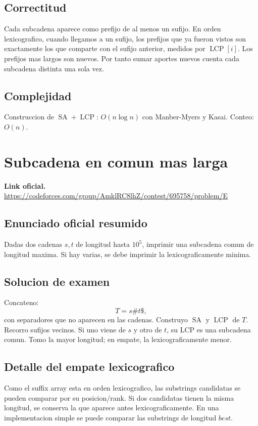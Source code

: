 \documentclass[10pt]{article}
\newcommand{\bigO}{O}
\newcommand{\SA}{\operatorname{SA}}
\newcommand{\LCP}{\operatorname{LCP}}
\begin{document}
\subsection{Correctitud}
Cada subcadena aparece como prefijo de al menos un sufijo. En orden
lexicografico, cuando llegamos a un sufijo, los prefijos que ya fueron vistos
son exactamente los que comparte con el sufijo anterior, medidos por $\LCP[i]$.
Los prefijos mas largos son nuevos. Por tanto sumar aportes nuevos cuenta cada
subcadena distinta una sola vez.

\subsection{Complejidad}
Construccion de $\SA+\LCP$: $\bigO(n\log n)$ con Manber-Myers y Kasai. Conteo:
$\bigO(n)$.

\newpage

\section{Subcadena en comun mas larga}
\textbf{Link oficial.} \url{https://codeforces.com/group/AmklRC8lhZ/contest/695758/problem/E}

\subsection{Enunciado oficial resumido}
Dadas dos cadenas $s,t$ de longitud hasta $10^5$, imprimir una subcadena comun
de longitud maxima. Si hay varias, se debe imprimir la lexicograficamente minima.

\subsection{Solucion de examen}
Concateno:
\[
T=s\#t\$,
\]
con separadores que no aparecen en las cadenas. Construyo $\SA$ y $\LCP$ de
$T$. Recorro sufijos vecinos. Si uno viene de $s$ y otro de $t$, su LCP es una
subcadena comun. Tomo la mayor longitud; en empate, la lexicograficamente menor.

\subsection{Detalle del empate lexicografico}
Como el suffix array esta en orden lexicografico, las substrings candidatas se
pueden comparar por su posicion/rank. Si dos candidatas tienen la misma
longitud, se conserva la que aparece antes lexicograficamente. En una
implementacion simple se puede comparar las substrings de longitud $best$.
\end{document}
